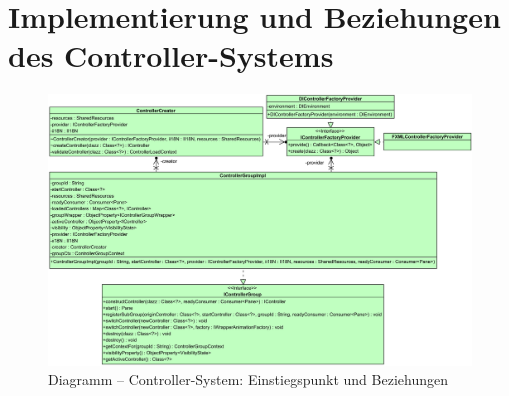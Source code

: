 \chapter{Implementierung und Beziehungen des Controller-Systems}
\label{appendix:controller_system}
\begin{figure}[H]
	\centering
	\includegraphics[angle=90,height=\textheight-2.2cm]{Abbildungen/Controller-System-Full.png}
	\caption*{Diagramm -- Controller-System: Einstiegspunkt und Beziehungen}
\end{figure}